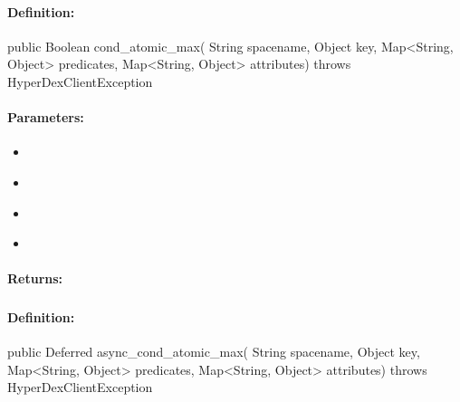 \paragraph{Definition:}
\begin{javacode}
public Boolean cond_atomic_max(
        String spacename,
        Object key,
        Map<String, Object> predicates,
        Map<String, Object> attributes) throws HyperDexClientException
\end{javacode}

\paragraph{Parameters:}
\begin{itemize}[noitemsep]
\item {}\\

\item {}\\

\item {}\\

\item {}\\

\end{itemize}

\paragraph{Returns:}


\pagebreak
\subsubsection{}
\label{api:java:async_cond_atomic_max}


\paragraph{Definition:}
\begin{javacode}
public Deferred async_cond_atomic_max(
        String spacename,
        Object key,
        Map<String, Object> predicates,
        Map<String, Object> attributes) throws HyperDexClientException
\end{javacode}

